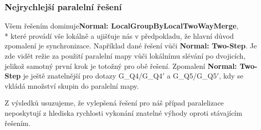 \subsubsection{Nejrychlejší paralelní řešení}

Všem řešením dominuje\textbf{Normal: LocalGroupByLocalTwoWayMerge},\\* které provádí vše lokálně a ujišťuje nás v předpokladu, že hlavní důvod zpomalení je synchronizace.
Například dané řešení vůči \textbf{Normal: Two-Step}. 
Je zde vidět režie za použití paralelní mapy vůči lokálnímu slévání po dvojicích, jelikož samotný první krok je totožný pro obě řešení.
Zpomalení \textbf{Normal: Two-Step} je ještě znatelnější pro dotazy G\_Q4/G\_Q4$'$ a G\_Q5/G\_Q5$'$, kdy se vkládá množství skupin do paralelní mapy.

\bigskip
Z výsledků usuzujeme, že vylepšená řešení pro náš případ paralelizace neposkytují z hlediska rychlosti vykonání znatelné výhody oproti stávajícím řešením.

